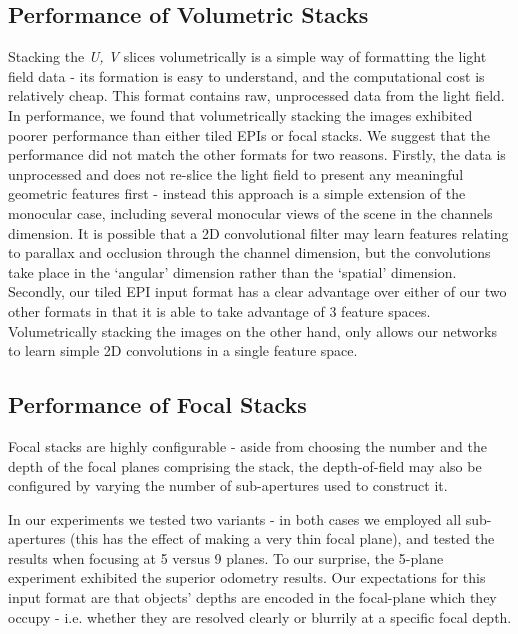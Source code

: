 \subsection{Performance of Volumetric Stacks}

Stacking the \textit{U, V} slices volumetrically is a simple way of formatting the light field data - its formation is easy to understand, and the computational cost is relatively cheap. This format contains raw, unprocessed data from the light field. In performance, we found that volumetrically stacking the images exhibited poorer performance than either tiled EPIs or focal stacks. We suggest that the performance did not match the other formats for two reasons. Firstly, the data is unprocessed and does not re-slice the light field to present any meaningful geometric features first - instead this approach is a simple extension of the monocular case, including several monocular views of the scene in the channels dimension. It is possible that a 2D convolutional filter may learn features relating to parallax and occlusion through the channel dimension, but the convolutions take place in the `angular' dimension rather than the `spatial' dimension. Secondly, our tiled EPI input format has a clear advantage over either of our two other formats in that it is able to take advantage of 3 feature spaces. Volumetrically stacking the images on the other hand, only allows our networks to learn simple 2D convolutions in a single feature space. 

\subsection{Performance of Focal Stacks}
Focal stacks are highly configurable - aside from choosing the number and the depth of the focal planes comprising the stack, the depth-of-field may also be configured by varying the number of sub-apertures used to construct it. 

In our experiments we tested two variants - in both cases we employed all sub-apertures (this has the effect of making a very thin focal plane), and tested the results when focusing at 5 versus 9 planes. To our surprise, the 5-plane experiment exhibited the superior odometry results. Our expectations for this input format are that objects' depths are encoded in the focal-plane which they occupy - i.e. whether they are resolved clearly or blurrily at a specific focal depth. 

